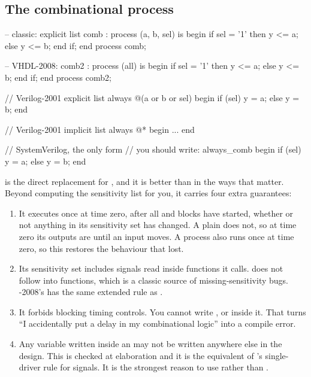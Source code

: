 \subsection{The combinational process}

\begin{rosetta}
\begin{rleft}
-- classic: explicit list
comb : process (a, b, sel) is
begin
  if sel = '1' then
    y <= a;
  else
    y <= b;
  end if;
end process comb;

-- VHDL-2008:
comb2 : process (all) is
begin
  if sel = '1' then y <= a;
  else              y <= b;
  end if;
end process comb2;
\end{rleft}
\begin{rright}
// Verilog-2001 explicit list
always @(a or b or sel) begin
  if (sel) y = a;
  else     y = b;
end

// Verilog-2001 implicit list
always @* begin ... end

// SystemVerilog, the only form
// you should write:
always_comb begin
  if (sel) y = a;
  else     y = b;
end
\end{rright}
\end{rosetta}


 is the direct replacement for , and it
is better than  in the ways that matter. Beyond computing
the sensitivity list for you, it carries four extra guarantees:

\begin{enumerate}
  \item It executes once at time zero, after all  and
         blocks have started, whether or not anything in its
        sensitivity set has changed. A plain  does not, so at
        time zero its outputs are  until an input moves. A \VHDL{}
        process also runs once at time zero, so this restores the \VHDL{}
        behaviour that  lost.
  \item Its sensitivity set includes signals read inside functions it calls.
         does not follow into functions, which is a classic
        source of missing-sensitivity bugs. \VHDL{}-2008's 
        has the same extended rule as .
  \item It forbids blocking timing controls. You cannot write ,
         or  inside it. That turns ``I
        accidentally put a delay in my combinational logic'' into a compile
        error.
  \item Any variable written inside an  may not be written
        anywhere else in the design. This is checked at elaboration and it is
        the \SV{} equivalent of \VHDL{}'s single-driver rule for signals. It is
        the strongest reason to use  rather than
        .
\end{enumerate}

